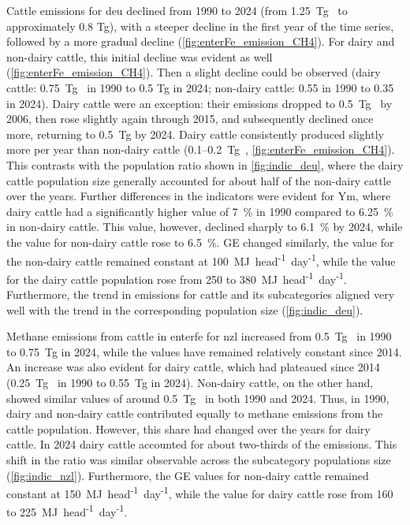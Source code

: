 Cattle emissions for \acrshort{deu} declined from 1990 to 2024 (from 1.25~Tg~ to approximately 0.8 Tg), with a steeper decline in the first year of the time series, followed by a more gradual decline (\cref{fig:enterFe_emission_CH4}).
For dairy and non-dairy cattle, this initial decline was evident as well (\cref{fig:enterFe_emission_CH4}). Then a slight decline could be observed (dairy cattle: 0.75~Tg~ in 1990 to 0.5 Tg in 2024; non-dairy cattle: 0.55 in 1990 to 0.35 in 2024). Dairy cattle were an exception: their emissions dropped to 0.5~Tg~ by 2006, then rose slightly again through 2015, and subsequently declined once more, returning to 0.5~Tg by 2024.
Dairy cattle consistently produced slightly more  per year than non-dairy cattle (0.1–0.2~Tg~, \cref{fig:enterFe_emission_CH4}). This contrasts with the population ratio shown in \cref{fig:indic_deu}, where the dairy cattle population size generally accounted for about half of the non-dairy cattle over the years.
Further differences in the indicators were evident for Ym, where dairy cattle had a significantly higher value of 7~\% in 1990 compared to 6.25~\% in non-dairy cattle. This value, however, declined sharply to 6.1~\% by 2024, while the value for non-dairy cattle rose to 6.5~\%. \acrshort{GE} changed similarly, the value for the non-dairy cattle remained constant at 100~MJ~head\textsuperscript{-1}~day\textsuperscript{-1}, while the value for the dairy cattle population rose from 250 to 380~MJ~head\textsuperscript{-1}~day\textsuperscript{-1}. Furthermore, the trend in emissions for cattle and its subcategories aligned very well with the trend in the corresponding population size (\cref{fig:indic_deu}). 

Methane emissions from cattle in \acrshort{enterfe} for \acrshort{nzl} increased from 0.5~Tg~ in 1990 to 0.75~Tg in 2024, while the values have remained relatively constant since 2014.
An increase was also evident for dairy cattle, which had plateaued since 2014 (0.25~Tg~ in 1990 to 0.55~Tg in 2024). Non-dairy cattle, on the other hand, showed similar values of around 0.5~Tg~ in both 1990 and 2024.
Thus, in 1990, dairy and non-dairy cattle contributed equally to methane emissions from the cattle population. However, this share had changed over the years for dairy cattle. In 2024 dairy cattle accounted for about two-thirds of the emissions. This shift in the ratio was similar observable across the subcategory populations size (\cref{fig:indic_nzl}). Furthermore, the \acrshort{GE} values for non-dairy cattle remained constant at 150~MJ~head\textsuperscript{-1}~day\textsuperscript{-1}, while the value for dairy cattle rose from 160 to 225~MJ~head\textsuperscript{-1}~day\textsuperscript{-1}.

